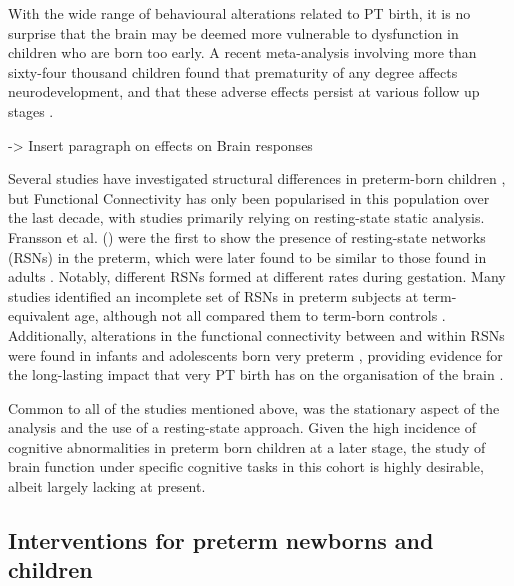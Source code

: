 
With the wide range of behavioural alterations related to PT birth, it is no surprise that the brain may be deemed more vulnerable to dysfunction in children who are born too early. 
A recent meta-analysis involving more than sixty-four thousand children found that prematurity of any degree affects neurodevelopment, and that these adverse effects persist at various follow up stages \citep{Allotey2018}. 


-> Insert paragraph on effects on Brain responses


Several studies have investigated structural differences in preterm-born children \citep{Huppi1998b, Brown2014, Kersbergen2014, KostovicSrzentic2019}, but Functional Connectivity has only been popularised in this population over the last decade, with studies primarily relying on resting-state static analysis. 
Fransson et al. (\citeyear{Fransson2007}) were the first to show the presence of resting-state networks (RSNs) in the preterm, which were later found to be similar to those found in adults \citep{Doria2010}. 
Notably, different RSNs formed at different rates during gestation. Many studies identified an incomplete set of RSNs in preterm subjects at term-equivalent age, although not all compared them to term-born controls \citep{Lin2008, Fransson2007, Fransson2011, Gao2015}.
Additionally, alterations in the functional connectivity between and within RSNs were found in infants \citep{Gozdas2018} and adolescents \citep{Wehrle2018} born very preterm , providing evidence for the long-lasting impact that very PT birth has on the organisation of the brain \citep{Damaraju2010,White2014,Johns2019}. 

Common to all of the studies mentioned above, was the stationary aspect of the analysis and the use of a resting-state approach. 
Given the high incidence of cognitive abnormalities in preterm born children at a later stage, the study of brain function under specific cognitive tasks in this cohort is highly desirable, albeit largely lacking at present.

\subsection{Interventions for preterm newborns and children}

